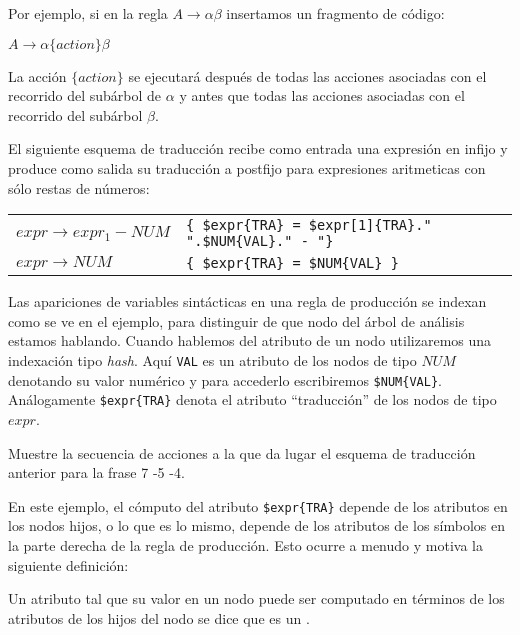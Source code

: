 Por ejemplo, si en la regla $A \rightarrow \alpha \beta $
insertamos un fragmento de código:

\begin{center}
$A \rightarrow \alpha \{ action \} \beta $
\end{center}

La acción $\{ action \}$ se ejecutará después de todas las acciones
asociadas con el recorrido del subárbol de $\alpha$ y antes que todas
las acciones asociadas con el recorrido del subárbol $\beta$.

El siguiente esquema de traducción recibe como entrada una expresión en infijo
y produce como salida su traducción a postfijo para expresiones aritmeticas con sólo 
restas de números:

\vspace{0.5cm}
\begin{tabular}{ll}
$expr   \rightarrow expr_1  -  NUM$  & \verb|{ $expr{TRA} = $expr[1]{TRA}." ".$NUM{VAL}." - "}| \\
$expr   \rightarrow NUM$             & \verb|{ $expr{TRA} = $NUM{VAL} }|
\end{tabular}
\vspace{0.5cm}

Las apariciones de variables sintácticas en una regla de producción se indexan
como se ve en el ejemplo, para distinguir de que nodo del árbol de análisis estamos
hablando. Cuando hablemos del atributo de un nodo utilizaremos una indexación tipo
\emph{hash}. Aquí \verb|VAL| es un atributo de los nodos de tipo $NUM$ denotando
su valor numérico y para accederlo escribiremos \verb|$NUM{VAL}|.
Análogamente \verb|$expr{TRA}| denota el atributo ``traducción'' de
los nodos de tipo $expr$.

\begin{exercise}
Muestre la secuencia de acciones a la
que da lugar el esquema de traducción anterior 
para la frase 7 -5 -4.
\end{exercise}

En este ejemplo, el cómputo del atributo \verb|$expr{TRA}| depende de los atributos
en los nodos hijos, o lo que es lo mismo, depende de los atributos de los símbolos
en la parte derecha de la regla de producción. Esto ocurre a menudo y motiva la siguiente
definición:

\begin{definition}
Un atributo tal que su valor en un nodo
puede ser computado en términos de los atributos de los hijos del nodo se dice
que es un .
\end{definition}

